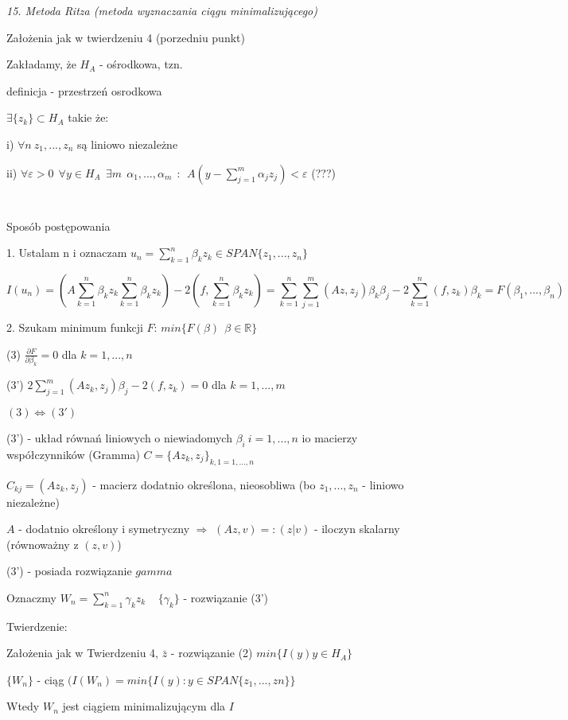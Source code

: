 \textit{15. Metoda Ritza (metoda wyznaczania ciągu minimalizującego)}

Założenia jak w twierdzeniu 4 (porzedniu punkt)

Zakładamy, że $H_A$ - ośrodkowa, tzn.

definicja - przestrzeń osrodkowa

$\exists \{z_k\} \subset H_A$ takie że:

i) $\forall n\ z_1, ..., z_n$ są liniowo niezależne

ii) $\forall \varepsilon > 0\ \ \forall y \in H_A \ \ \exists m\ \ \alpha _1, ..., \alpha _m\ \ : \ \ A(y - \sum_{j=1}^{m} \alpha _j z_j) < \varepsilon$ (???)

$\ $

$\ $

Sposób postępowania

1. Ustalam n i oznaczam $u_n = \sum_{k=1}^{n} \beta _k z_k \in SPAN\{z_1, ..., z_n\}$

\[ I(u_n) = (A\sum_{k=1}^{n} \beta _k z_k \sum_{k=1}^{n} \beta _k z_k) - 2(f, \sum_{k=1}^{n} \beta _k z_k) = \sum_{k=1}^{n}\sum_{j=1}^{m} (Az,z_j) \beta _k \beta _j - 2\sum_{k=1}^{n} (f, z_k) \beta _k = F(\beta _1, ..., \beta _n)\]

2. Szukam minimum funkcji $F$: $min\{F(\beta)\ \ \beta \in \mathbb{R}\}$

(3) $\frac{\partial F}{\partial \beta _k} = 0$ dla $k = 1,...,n$

(3') $2 \sum_{j=1}^{m} (Az_k, z_j) \beta _j - 2(f, z_k) = 0$ dla $k = 1,...,m$

$ (3) \Leftrightarrow (3') $

(3') - układ równań liniowych o niewiadomych $\beta _i\ i = 1,...,n$ io macierzy współczynników (Gramma) $C = \{ Az_k, z_j \}_{k,1 = 1,...,n}$

$C_{kj} = (Az_k, z_j)$ - macierz dodatnio określona, nieosobliwa (bo $z_1,...,z_n$ - liniowo niezależne)

$A$ - dodatnio określony i symetryczny $\Rightarrow$ $(Az,v) =: (z|v)$ - iloczyn skalarny (równoważny z $(z,v)$)

(3') - posiada rozwiązanie $gamma$

Oznaczmy $W_n = \sum_{k=1}^{n} \gamma _k z_k\ \ \ \ \ \{\gamma _k\}$ - rozwiązanie (3')

Twierdzenie:

Założenia jak w Twierdzeniu 4, $\bar{z}$ - rozwiązanie (2) $ min\{ I(y) y \in H_A \}$

$\{W_n\}$ - ciąg $(I(W_n) = min\{I(y): y \in SPAN\{z_1,...,zn\}\}$

Wtedy ${W_n}$ jest ciągiem minimalizującym dla $I$


